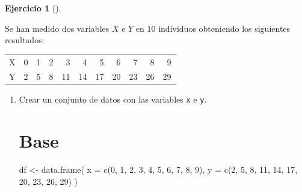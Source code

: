 \documentclass[
  a4paper,
]{scrreport}
\newenvironment{Shaded}{\begin{snugshade}}{\end{snugshade}}
\newcommand{\AttributeTok}[1]{\textcolor[rgb]{0.40,0.45,0.13}{#1}}
\newcommand{\DecValTok}[1]{\textcolor[rgb]{0.68,0.00,0.00}{#1}}
\newcommand{\FunctionTok}[1]{\textcolor[rgb]{0.28,0.35,0.67}{#1}}
\newcommand{\NormalTok}[1]{\textcolor[rgb]{0.00,0.23,0.31}{#1}}
\newcommand{\OtherTok}[1]{\textcolor[rgb]{0.00,0.23,0.31}{#1}}
\theoremstyle{definition}
\newtheorem{exercise}{Ejercicio}[chapter]
\theoremstyle{remark}
\begin{document}
\begin{exercise}[]\protect\hypertarget{exr-regresion-1}{}\label{exr-regresion-1}

Se han medido dos variables \(X\) e \(Y\) en 10 individuos obteniendo
los siguientes resultados:

\begin{longtable}[]{@{}lrrrrrrrrrr@{}}
\toprule\noalign{}
\endhead
\bottomrule\noalign{}
\endlastfoot
X & 0 & 1 & 2 & 3 & 4 & 5 & 6 & 7 & 8 & 9 \\
Y & 2 & 5 & 8 & 11 & 14 & 17 & 20 & 23 & 26 & 29 \\
\end{longtable}

\begin{enumerate}
\def\labelenumi{\alph{enumi}.}
\item
  Crear un conjunto de datos con las variables \texttt{x} e \texttt{y}.

  \begin{tcolorbox}[enhanced jigsaw, colframe=quarto-callout-tip-color-frame, toprule=.15mm, bottomtitle=1mm, breakable, opacitybacktitle=0.6, toptitle=1mm, colback=white, bottomrule=.15mm, title=\textcolor{quarto-callout-tip-color}{\faLightbulb}\hspace{0.5em}{Solución}, arc=.35mm, left=2mm, titlerule=0mm, rightrule=.15mm, coltitle=black, leftrule=.75mm, opacityback=0, colbacktitle=quarto-callout-tip-color!10!white]

  \section{Base}

\begin{Shaded}
\begin{Highlighting}[]
\NormalTok{df }\OtherTok{\textless{}{-}} \FunctionTok{data.frame}\NormalTok{(}
    \AttributeTok{x =} \FunctionTok{c}\NormalTok{(}\DecValTok{0}\NormalTok{, }\DecValTok{1}\NormalTok{, }\DecValTok{2}\NormalTok{, }\DecValTok{3}\NormalTok{, }\DecValTok{4}\NormalTok{, }\DecValTok{5}\NormalTok{, }\DecValTok{6}\NormalTok{, }\DecValTok{7}\NormalTok{, }\DecValTok{8}\NormalTok{, }\DecValTok{9}\NormalTok{),}
    \AttributeTok{y =} \FunctionTok{c}\NormalTok{(}\DecValTok{2}\NormalTok{, }\DecValTok{5}\NormalTok{, }\DecValTok{8}\NormalTok{, }\DecValTok{11}\NormalTok{, }\DecValTok{14}\NormalTok{, }\DecValTok{17}\NormalTok{, }\DecValTok{20}\NormalTok{, }\DecValTok{23}\NormalTok{, }\DecValTok{26}\NormalTok{, }\DecValTok{29}\NormalTok{)}
\NormalTok{)}
\end{Highlighting}
\end{Shaded}


\end{tcolorbox}
\end{enumerate}
\end{exercise}
\end{document}
